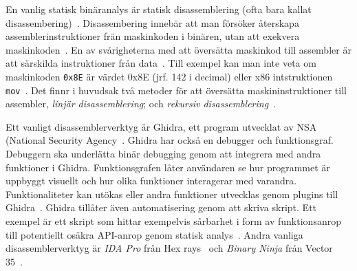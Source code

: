 En vanlig statisk binäranalys är statisk disassemblering (ofta bara kallat
disassembering)~\cite{andriesse2018}. Disassembering innebär att man försöker
återskapa assemblerinstruktioner frän maskinkoden i binären, utan att exekvera
maskinkoden~\cite{andriesse2018}. En av svårigheterna med att översätta maskinkod
till assembler är att särskilda instruktioner från data~\cite{andriesse2018}.
Till exempel kan man inte veta om maskinkoden \verb|0x8E| är värdet 0x8E (jrf.
142 i decimal) eller x86 intstruktionen \verb|mov|~\cite{andriesse2018}. Det
finnr i huvudsak två metoder för att översätta maskininstruktioner
till assembler, \emph{linjär disassemblering}; och \emph{rekursiv
disassemblering}~\cite{andriesse2018}.

Ett vanligt disassemblerverktyg är Ghidra, ett program utvecklat av NSA
(National Security Agency~\cite{ghidra_website}. Ghidra har också en debugger
och funktionsgraf. Debuggern ska underlätta binär debugging genom att
integrera med andra funktioner i Ghidra. Funktionsgrafen låter användaren se
hur programmet är uppbyggt visuellt och hur olika funktioner interagerar med
varandra. Funktionaliteter kan utökas eller andra funktioner utvecklas genom
plugins till Ghidra~\cite{ghidra_use_cases}. Ghidra tillåter även automatisering
genom att skriva skript. Ett exempel är ett skript som hittar exempelvis
sårbarhet i form av funktionsanrop till potentiellt osäkra API-anrop genom
statisk analys~\cite{ghidra_script}. Andra vanliga disassemblerverktyg är
\emph{IDA Pro} från Hex rays~\cite{hex_rays} och \emph{Binary Ninja} från Vector
35~\cite{binary_ninja}.
